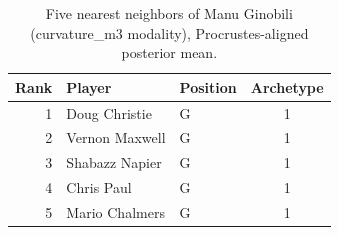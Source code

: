 \begin{table}[htbp]
  \centering\small
  \begin{tabular}{rllc}
    \toprule
    Rank & Player & Position & Archetype \\
    \midrule
    1 & Doug Christie & G & 1 \\
    2 & Vernon Maxwell & G & 1 \\
    3 & Shabazz Napier & G & 1 \\
    4 & Chris Paul & G & 1 \\
    5 & Mario Chalmers & G & 1 \\
    \bottomrule
  \end{tabular}
  \caption{Five nearest neighbors of Manu Ginobili (curvature_m3 modality), Procrustes-aligned posterior mean.}
  \label{tab:Manu_Ginobili_neighbors_curvature_m3}
\end{table}

